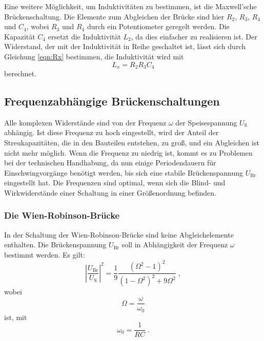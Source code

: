         Eine weitere Möglichkeit, um Induktivitäten zu bestimmen, ist die Maxwell'sche Brückenschaltung.
        Die Elemente zum Abgleichen der Brücke sind hier $R_2$, $R_3$, $R_4$ und $C_4$, wobei $R_3$ und $R_4$ durch ein
        Potentiometer geregelt werden. Die Kapazität $C_4$ ersetzt die Induktivität $L_2$, da dies
        einfacher zu realisieren ist.
        Der Widerstand, der mit der Induktivität in Reihe geschaltet ist, lässt sich durch Gleichung \eqref{eqn:Rx} bestimmen,
        die Induktivität wird mit
        \begin{equation}
            L_x = R_2 R_3 C_4 \label{sec:LxMax}
        \end{equation}
        berechnet.

\subsection{Frequenzabhängige Brückenschaltungen}

    Alle komplexen Widerstände sind von der Frequenz $\omega$ der Speisespannung $U_\text{S}$ abhängig.
    Ist diese Frequenz zu hoch eingestellt, wird der Anteil der Streukapazitäten, die in den Bauteilen
    entstehen, zu groß, und ein Abgleichen ist nicht mehr möglich.
    Wenn die Frequenz zu niedrig ist, kommt es zu Problemen bei der technischen Handhabung,
    da nun einige Periodendauern für Einschwingvorgänge benötigt werden, bis sich eine stabile Brückenspannung $U_\text{Br}$
    eingestellt hat.
    Die Frequenzen sind optimal, wenn sich die Blind- und Wirkwiderstände einer Schaltung
    in einer Größenordnung befinden.

    \subsubsection{Die Wien-Robinson-Brücke} \label{sec:WR}

        In der Schaltung der Wien-Robinson-Brücke sind keine Abgleichelemente enthalten.
        Die Brückenspannung $U_\text{Br}$ soll in Abhängigkeit der Frequenz $\omega$ bestimmt werden.
        Es gilt:
        \begin{equation}
        \label{eqn:WienRobinsonBrNachS}
            \left\lvert \frac{U_\text{Br}}{U_\text{S}} \right\rvert^2
            = \frac{1}{9} \frac{(\Omega^2 - 1)^2}{(1 - \Omega^2)^2 + 9\Omega^2}
            \; ,
        \end{equation}
        wobei
        \begin{equation}
            \Omega = \frac{\omega}{\omega_0} \label{eqn:GroßOmega}
        \end{equation}
        ist, mit
        \begin{equation}
            \omega_0 = \frac{1}{RC} \; . \label{eqn:omeganull}
        \end{equation}

